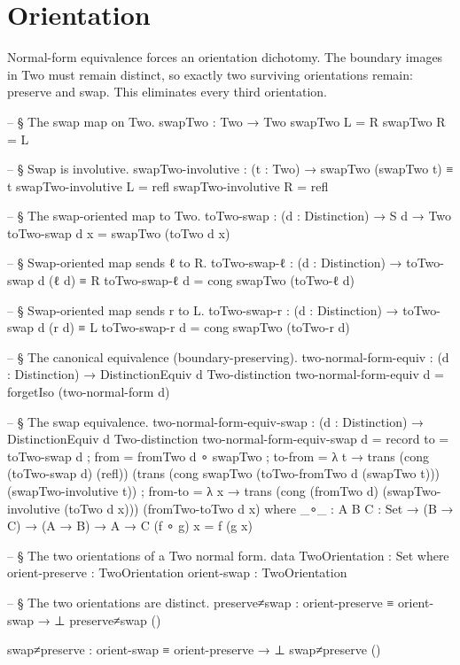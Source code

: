 \documentclass[11pt,a4paper]{book}
\def\texttt#1{#1}%
\begin{document}
\section{Orientation}

Normal-form equivalence forces an orientation dichotomy.
The boundary images in \texttt{Two} must remain distinct, so exactly two surviving orientations remain: preserve and swap.
This eliminates every third orientation.

\begin{code}
-- § The swap map on Two.
swapTwo : Two → Two
swapTwo L = R
swapTwo R = L

-- § Swap is involutive.
swapTwo-involutive : (t : Two) → swapTwo (swapTwo t) ≡ t
swapTwo-involutive L = refl
swapTwo-involutive R = refl

-- § The swap-oriented map to Two.
toTwo-swap : (d : Distinction) → S d → Two
toTwo-swap d x = swapTwo (toTwo d x)

-- § Swap-oriented map sends ℓ to R.
toTwo-swap-ℓ : (d : Distinction) → toTwo-swap d (ℓ d) ≡ R
toTwo-swap-ℓ d = cong swapTwo (toTwo-ℓ d)

-- § Swap-oriented map sends r to L.
toTwo-swap-r : (d : Distinction) → toTwo-swap d (r d) ≡ L
toTwo-swap-r d = cong swapTwo (toTwo-r d)

-- § The canonical equivalence (boundary-preserving).
two-normal-form-equiv : (d : Distinction) → DistinctionEquiv d Two-distinction
two-normal-form-equiv d = forgetIso (two-normal-form d)

-- § The swap equivalence.
two-normal-form-equiv-swap : (d : Distinction) → DistinctionEquiv d Two-distinction
two-normal-form-equiv-swap d = record
  { to      = toTwo-swap d
  ; from    = fromTwo d ∘ swapTwo
  ; to-from = λ t → trans (cong (toTwo-swap d) (refl)) (trans (cong swapTwo (toTwo-fromTwo d (swapTwo t))) (swapTwo-involutive t))
  ; from-to = λ x → trans (cong (fromTwo d) (swapTwo-involutive (toTwo d x))) (fromTwo-toTwo d x)
  }
  where
    _∘_ : {A B C : Set} → (B → C) → (A → B) → A → C
    (f ∘ g) x = f (g x)

-- § The two orientations of a Two normal form.
data TwoOrientation : Set where
  orient-preserve : TwoOrientation
  orient-swap     : TwoOrientation

-- § The two orientations are distinct.
preserve≠swap : orient-preserve ≡ orient-swap → ⊥
preserve≠swap ()

swap≠preserve : orient-swap ≡ orient-preserve → ⊥
swap≠preserve ()
\end{code}
\end{document}
